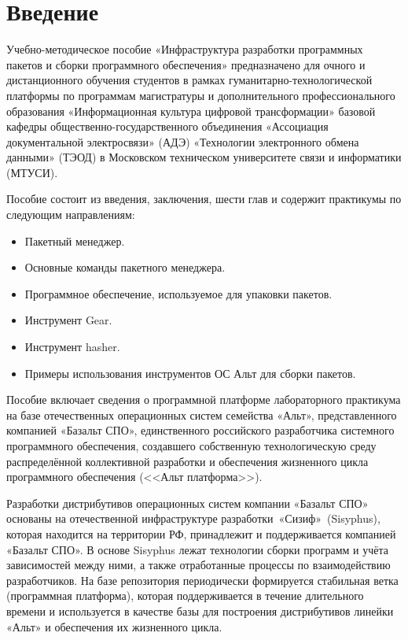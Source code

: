 \chapter*{Введение}

Учебно-методическое пособие «Инфраструктура разработки программных пакетов и сборки 
программного обеспечения» предназначено для очного и дистанционного обучения студентов 
в рамках гуманитарно-технологической платформы по программам магистратуры и 
дополнительного профессионального образования «Информационная культура цифровой 
трансформации» базовой кафедры общественно-государственного объединения «Ассоциация 
документальной электросвязи» (АДЭ) «Технологии электронного обмена данными» (ТЭОД) 
в Московском техническом университете связи и информатики (МТУСИ). 

Пособие состоит из введения, заключения, шести глав и содержит практикумы по следующим направлениям:
\begin{itemize}
	\item Пакетный менеджер.
	\item Основные команды пакетного менеджера.
	\item Программное обеспечение, используемое для упаковки пакетов.
	\item Инструмент Gear.
	\item Инструмент hasher.
	\item Примеры использования инструментов ОС Альт для сборки пакетов.
\end{itemize}

Пособие включает сведения о программной платформе лабораторного практикума на базе 
отечественных операционных систем семейства «Альт», представленного компанией «Базальт СПО», 
единственного российского разработчика системного программного обеспечения, создавшего 
собственную технологическую среду распределённой коллективной разработки и обеспечения 
жизненного цикла программного обеспечения (<<Альт платформа>>).

Разработки дистрибутивов операционных систем компании «Базальт СПО» основаны на 
отечественной инфраструктуре разработки «Сизиф» (Sisyphus), которая находится на 
территории РФ, принадлежит и поддерживается компанией «Базальт СПО». В основе 
Sisyphus лежат технологии сборки программ и учёта зависимостей между ними, а 
также отработанные процессы по взаимодействию разработчиков. На базе репозитория 
периодически формируется стабильная ветка (программная платформа), которая поддерживается 
в течение длительного времени и используется в качестве базы для построения дистрибутивов 
линейки «Альт» и обеспечения их жизненного цикла.

